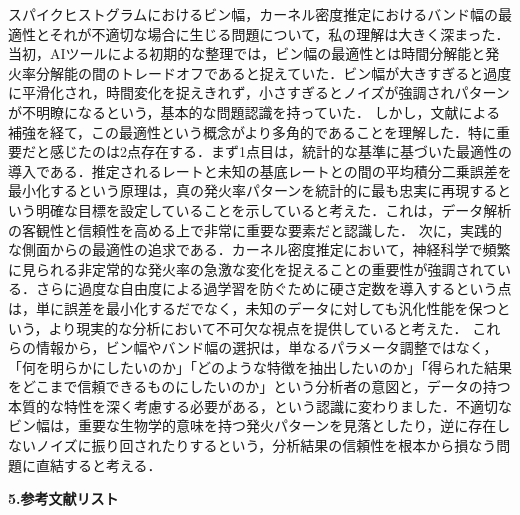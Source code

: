 \documentclass{classes/report}
\begin{document}
スパイクヒストグラムにおけるビン幅，カーネル密度推定におけるバンド幅の最適性とそれが不適切な場合に生じる問題について，私の理解は大きく深まった．
当初，AIツールによる初期的な整理では，ビン幅の最適性とは時間分解能と発火率分解能の間のトレードオフであると捉えていた．ビン幅が大きすぎると過度に平滑化され，時間変化を捉えきれず，小さすぎるとノイズが強調されパターンが不明瞭になるという，基本的な問題認識を持っていた．
しかし，文献による補強を経て，この最適性という概念がより多角的であることを理解した．特に重要だと感じたのは2点存在する．まず1点目は，統計的な基準に基づいた最適性の導入である．推定されるレートと未知の基底レートとの間の平均積分二乗誤差を最小化するという原理は，真の発火率パターンを統計的に最も忠実に再現するという明確な目標を設定していることを示していると考えた．これは，データ解析の客観性と信頼性を高める上で非常に重要な要素だと認識した．
次に，実践的な側面からの最適性の追求である．カーネル密度推定において，神経科学で頻繁に見られる非定常的な発火率の急激な変化を捉えることの重要性が強調されている．さらに過度な自由度による過学習を防ぐために硬さ定数を導入するという点は，単に誤差を最小化するだでなく，未知のデータに対しても汎化性能を保つという，より現実的な分析において不可欠な視点を提供していると考えた．
これらの情報から，ビン幅やバンド幅の選択は，単なるパラメータ調整ではなく，「何を明らかにしたいのか」「どのような特徴を抽出したいのか」「得られた結果をどこまで信頼できるものにしたいのか」という分析者の意図と，データの持つ本質的な特性を深く考慮する必要がある，という認識に変わりました．不適切なビン幅は，重要な生物学的意味を持つ発火パターンを見落としたり，逆に存在しないノイズに振り回されたりするという，分析結果の信頼性を根本から損なう問題に直結すると考える．

\textbf{\large 5.参考文献リスト}

\printbibliography[heading=none]
\end{document}
